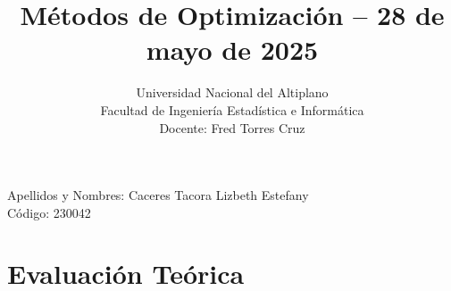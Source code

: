 \documentclass{article}
\begin{document}
\title{Métodos de Optimización -- 28 de mayo de 2025}
\author{Universidad Nacional del Altiplano\\
Facultad de Ingeniería Estadística e Informática\\
Docente: Fred Torres Cruz}
\date{}

\maketitle

\noindent Apellidos y Nombres: Caceres Tacora Lizbeth Estefany \\
Código: 230042

\section{Evaluación Teórica}
\end{document}
